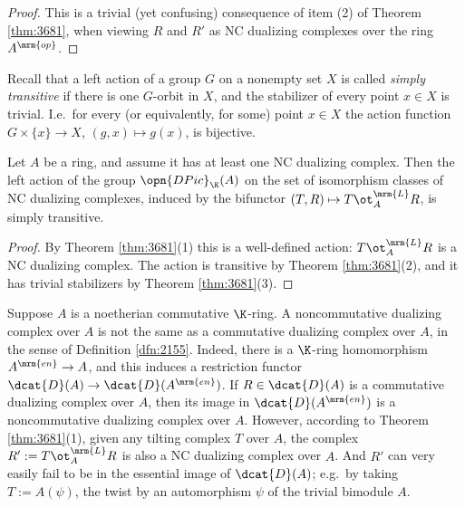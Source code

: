 \begin{proof}
This is a trivial (yet confusing) consequence of item (2) of  
Theorem \ref{thm:3681}, when viewing $R$ and $R'$ as NC dualizing complexes 
over the ring $A^{\mrm{op}}$. 
\end{proof}

Recall that a left action of a group $G$ on a nonempty set $X$ is called {\em 
simply transitive} if there is one $G$-orbit in $X$, and the stabilizer of 
every point $x \in X$ is trivial. I.e.\ for every (or equivalently, for some) 
point $x \in X$ the action function 
$G \times \{ x \} \to X$, $(g, x) \mapsto g(x)$, is bijective. 

\begin{cor} \label{cor:3690}
Let $A$ be a ring, and assume it has at least one NC dualizing complex. 
Then the left action of the group $\opn{DPic}_{\K}(A)$ on the set of 
isomorphism classes of NC dualizing complexes, induced by the bifunctor
$(T, R) \mapsto T \ot^{\mrm{L}}_{A} R$,
is simply transitive.  
\end{cor}

\begin{proof}
By Theorem \ref{thm:3681}(1) this is a well-defined action:
$T \ot^{\mrm{L}}_{A} R$ is a NC dualizing complex. 
The action is transitive by Theorem \ref{thm:3681}(2), and it has trivial 
stabilizers by Theorem \ref{thm:3681}(3).
\end{proof}

\begin{rem} \label{rem:3696}
Suppose $A$ is a noetherian commutative $\K$-ring.
A noncommutative dualizing complex over $A$ is not the same as a commutative
dualizing complex over $A$, in the sense of Definition \ref{dfn:2155}. Indeed, 
there is a $\K$-ring 
homomorphism 
$A^{\mrm{en}} \to A$, and this induces a restriction functor 
$\dcat{D}(A) \to \dcat{D}(A^{\mrm{en}})$. 
If $R \in \dcat{D}(A)$ is a commutative dualizing complex over $A$, then
its image in $\dcat{D}(A^{\mrm{en}})$ is a noncommutative dualizing complex 
over $A$. However, according to Theorem \ref{thm:3681}(1), 
given any tilting complex $T$ over $A$, the complex 
$R' := T \ot^{\mrm{L}}_{A} R$
is also a NC dualizing complex over $A$. And $R'$ can very easily fail to be in 
the essential image of $\dcat{D}(A)$; e.g.\ by taking 
$T := A(\psi)$, the twist by an automorphism $\psi$ of the trivial bimodule 
$A$. 
\end{rem}

